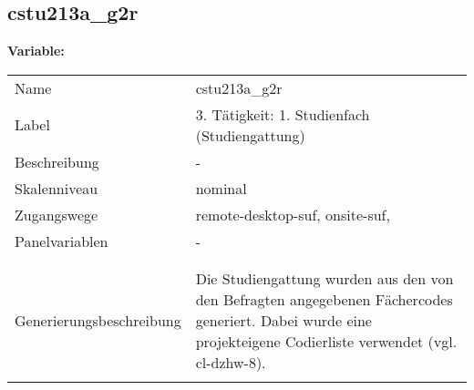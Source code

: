 	
	
	\subsection{cstu213a\_g2r}
	\label{subSection:cstu213a_g2r}

	\noindent\textbf{Variable:}\\
		\begin{tabular}{lL{11.3cm}}
			\label{tableVariable:cstu213a_g2r}
			Name & cstu213a\_g2r \\
			Label & 3. Tätigkeit: 1. Studienfach (Studiengattung) \\
			Beschreibung & - \\
			Skalenniveau & nominal \\
			Zugangswege &
				remote-desktop-suf,
				onsite-suf,
 \\
			Panelvariablen & -
			 \\
			 \\
 \\
					Generierungsbeschreibung & Die Studiengattung wurden aus den von den Befragten angegebenen Fächercodes generiert.  Dabei wurde eine projekteigene Codierliste verwendet (vgl. cl-dzhw-8).
				 \\	
			 \\
		\end{tabular}






